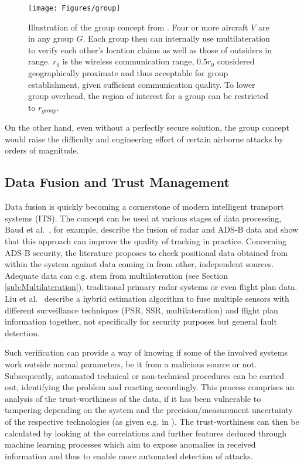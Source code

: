 \documentclass[english]{IEEEtran}
\begin{document}
\begin{figure}
\texttt{[image: Figures/group]}

\caption{Illustration of the group concept from \cite{Sampigethaya2011}. Four
or more aircraft ${V}$ are in any group $G$. Each group then can
internally use multilateration to verify each other's location claims
as well as those of outsiders in range. $r_{0}$ is the wireless communication
range, $0.5r_{0}$ considered geographically proximate and thus acceptable
for group establishment, given sufficient communication quality. To
lower group overhead, the region of interest for a group can be restricted
to $r_{group}$.}
\end{figure}


On the other hand, even without a perfectly secure solution, the group
concept would raise the difficulty and engineering effort of certain
airborne attacks by orders of magnitude. \\



\subsection{Data Fusion and Trust Management}

Data fusion is quickly becoming a cornerstone of modern intelligent
transport systems (ITS). The concept can be used at various stages
of data processing, Baud et al.~\cite{Baud2006}, for example, describe
the fusion of radar and ADS-B data and show that this approach can
improve the quality of tracking in practice. Concerning ADS-B security,
the literature proposes to check positional data obtained from within
the system against data coming in from other, independent sources.
Adequate data can e.g. stem from multilateration (see Section \ref{sub:Multilateration}),
traditional primary radar systems or even flight plan data. Liu et
al.~\cite{liu2013multi} describe a hybrid estimation algorithm to
fuse multiple sensors with different surveillance techniques (PSR,
SSR, multilateration) and flight plan information together, not specifically
for security purposes but general fault detection.

Such verification can provide a way of knowing if some of the involved
systems work outside normal parameters, be it from a malicious source
or not. Subsequently, automated technical or non-technical procedures
can be carried out, identifying the problem and reacting accordingly.
This process comprises an analysis of the trust-worthiness of the
data, if it has been vulnerable to tampering depending on the system
and the precision/measurement uncertainty of the respective technologies
(as given e.g. in \cite{Smith2006}). The trust-worthiness can then
be calculated by looking at the correlations and further features
deduced through machine learning processes which aim to expose anomalies
in received information and thus to enable more automated detection
of attacks.
\end{document}
